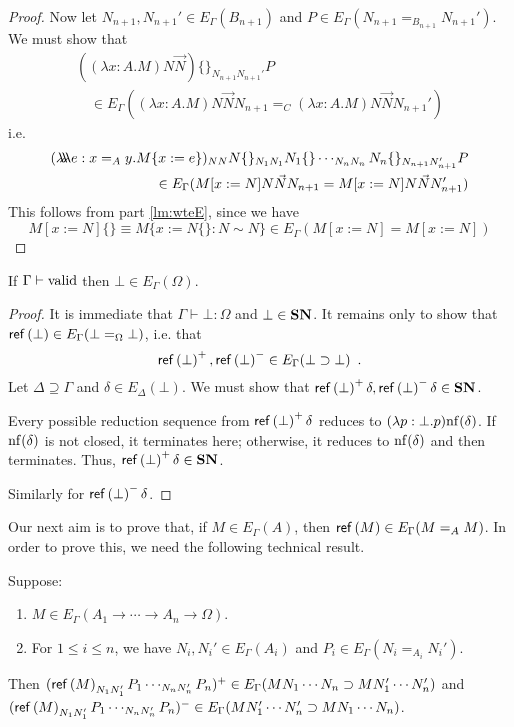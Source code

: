 \begin{proof}
Now let $N_{n+1}, N_{n+1}' \in E_\Gamma(B_{n+1})$ and $P \in E_\Gamma(N_{n+1} =_{B_{n+1}} N_{n+1}')$.  We must show that
\begin{align*}
((\lambda x:A.M)N \vec{N}) \{\}_{N_{n+1}N_{n+1}'}P \\
\quad \in E_\Gamma((\lambda x:A.M) N \vec{N} N_{n+1} =_C (\lambda x:A.M) N \vec{N} N_{n+1}')
\end{align*}
i.e.
\begin{align*}
(\lambda \!\! \lambda \!\! \lambda e:x =_A y . M \{ x:=e \})_{NN} N \{ \}_{N_1 N_1} N_1\{\} \cdots_{N_n N_n} N_n\{\}_{N_{n+1} N_{n+1}'} P \\
\quad \in E_\Gamma(M[x:=N] N \vec{N} N_{n+1} = M[x:=N] N \vec{N} N_{n+1}')
\end{align*}
This follows from part \ref{lm:wteE}, since we have
\[ M[x:=N]\{\} \equiv M \{ x:= N \{ \} : N \sim N \} \in E_\Gamma(M[x:=N] = M[x:=N]) \]
\end{proof}

\begin{lm}
\label{lm:Ebot}
If $\Gamma \vdash \mathrm{valid}$ then $\bot \in E_\Gamma(\Omega)$.
\end{lm}

\begin{proof}
It is immediate that $\Gamma \vdash \bot : \Omega$ and $\bot \in \mathbf{SN}$.  It remains only to show that $\mathsf{ref} \left( {\bot} \right) \in E_\Gamma(\bot =_\Omega \bot)$, i.e. that
$$ \mathsf{ref} \left( {\bot} \right)^+, \mathsf{ref} \left( {\bot} \right)^- \in E_\Gamma(\bot \supset \bot) \enspace . $$
Let $\Delta \supseteq \Gamma$ and $\delta \in E_\Delta(\bot)$.  We must show that $\mathsf{ref} \left( {\bot} \right)^+ \delta, \mathsf{ref} \left( {\bot} \right)^- \delta \in \mathbf{SN}$.

Every possible reduction sequence from $\mathsf{ref} \left( {\bot} \right)^+ \delta$ reduces to $(\lambda p:\bot.p) \mathrm{nf} ( {\delta} )$.  If $\mathrm{nf} ( {\delta} )$ is not closed, it terminates here; otherwise, it reduces to $\mathrm{nf} ( {\delta} )$ and then terminates.  Thus, $\mathsf{ref} \left( {\bot} \right)^+ \delta \in \mathbf{SN}$.

Similarly for $\mathsf{ref} \left( {\bot} \right)^- \delta$.
\end{proof}

Our next aim is to prove that, if $M \in E_\Gamma(A)$, then $\mathsf{ref} \left( {M} \right) \in E_\Gamma(M =_A M)$.  In order to prove this,
we need the following technical result.

\begin{lm}
\label{lm:pre-ref}
Suppose:
\begin{enumerate}
\item
$M \in E_\Gamma(A_1 \rightarrow \cdots \rightarrow A_n \rightarrow \Omega)$.
\item
For $1 \leq i \leq n$, we have $N_i, N_i' \in E_\Gamma(A_i)$ and $P_i \in E_\Gamma(N_i =_{A_i} N_i')$.
\end{enumerate}
Then $(\mathsf{ref} \left( {M} \right)_{N_1 N_1'} P_1 \cdots_{N_n N_n'} P_n)^+ \in E_\Gamma(M N_1 \cdots N_n \supset M N_1' \cdots N_n')$
and $(\mathsf{ref} \left( {M} \right)_{N_1 N_1'} P_1 \cdots_{N_n N_n'} P_n)^- \in E_\Gamma(M N_1' \cdots N_n' \supset M N_1 \cdots N_n)$.
\end{lm}

